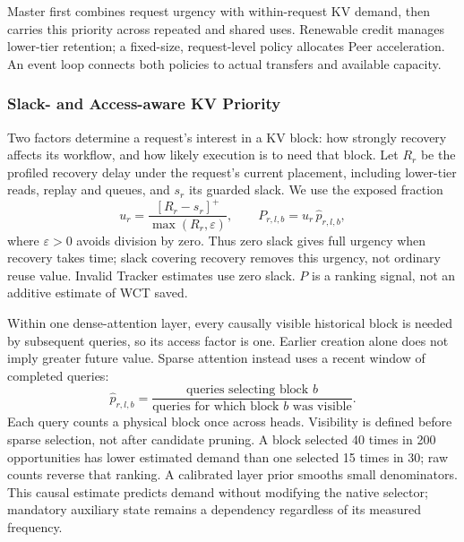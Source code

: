 Master first combines request urgency with within-request KV demand,
then carries this priority across repeated and shared uses. Renewable
credit manages lower-tier retention; a fixed-size, request-level policy
allocates Peer acceleration. An event loop connects both policies to
actual transfers and available capacity.

\subsubsection{Slack- and Access-aware KV Priority}
\label{sec:placement-value}
\label{sec:prefix-value}

Two factors determine a request's interest in a KV block:
how strongly recovery affects its workflow, and how likely execution is
to need that block. Let $R_r$ be the profiled recovery delay under the
request's current placement, including lower-tier reads, replay and
queues, and $s_r$ its guarded slack. We use the exposed fraction
\begin{equation}
 u_r=\frac{[R_r-s_r]^+}{\max(R_r,\varepsilon)},
 \qquad P_{r,l,b}=u_r\,\widehat p_{r,l,b},
 \label{eq:value}
\end{equation}
where $\varepsilon>0$ avoids division by zero. Thus zero slack gives full
urgency when recovery takes time; slack covering recovery removes this
urgency, not ordinary reuse value. Invalid Tracker estimates use zero
slack. $P$ is a ranking signal, not an additive estimate of WCT saved.

Within one dense-attention layer, every causally visible historical block
is needed by subsequent queries, so its access factor is one. Earlier
creation alone does not imply greater future value. Sparse attention
instead uses a recent window of completed queries:
\begin{equation}
 \widehat p_{r,l,b}=
 \frac{\text{queries selecting block }b}
      {\text{queries for which block }b\text{ was visible}}.
 \label{eq:selection-probability}
\end{equation}
Each query counts a physical block once across heads. Visibility is
defined before sparse selection, not after candidate pruning. A block
selected 40 times in 200 opportunities has lower estimated demand than
one selected 15 times in 30; raw counts reverse that ranking. A calibrated
layer prior smooths small denominators. This causal estimate predicts
demand without modifying the native selector; mandatory auxiliary state
remains a dependency regardless of its measured frequency.

